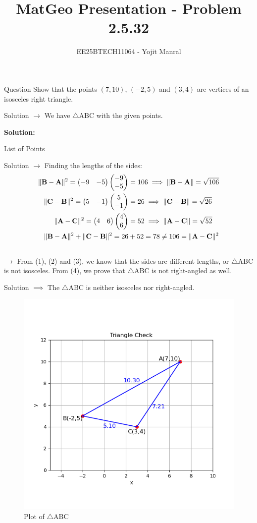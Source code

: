\documentclass{beamer}
\title{MatGeo Presentation - Problem 2.5.32}
\author{EE25BTECH11064 - Yojit Manral}
\date{}
\numberwithin{equation}{section}
\providecommand{\brak}[1]{\ensuremath{\left(#1\right)}}
\theoremstyle{remark}
\providecommand{\norm}[1]{\lVert#1\rVert}
\newcommand{\myvec}[1]{\ensuremath{\begin{pmatrix}#1\end{pmatrix}}}
\let\vec\mathbf
\begin{document}
\frame{\titlepage}
\begin{frame}{Question}
Show that the points $\brak{7,10}$, $\brak{-2,5}$ and $\brak{3,4}$ are vertices of an isosceles right triangle.
\end{frame}

\begin{frame}{Solution}
$\rightarrow$ We have $\triangle$ABC with the given points.

\textbf{Solution:}
\begin{table}[h!]    
  \centering
  
  \caption{List of Points}
  \label{Table_1}
\end{table}
\end{frame}

\begin{frame}{Solution}
$\rightarrow$ Finding the lengths of the sides:
\begin{align}
    \norm{\vec{B} - \vec{A}}^2 = \myvec{-9 & -5}\myvec{-9\\-5} &= 106 \implies \norm{\vec{B} - \vec{A}} = \sqrt{106}\\
    \norm{\vec{C} - \vec{B}}^2 = \myvec{5 & -1}\myvec{5\\-1} &= 26 \implies \norm{\vec{C} - \vec{B}} = \sqrt{26}\\
    \norm{\vec{A} - \vec{C}}^2 = \myvec{4 & 6}\myvec{4\\6} &= 52 \implies \norm{\vec{A} - \vec{C}} = \sqrt{52}\\
    \norm{\vec{B} - \vec{A}}^2 + \norm{\vec{C} - \vec{B}}^2 = 26 &+ 52 = 78 \neq 106 = \norm{\vec{A} - \vec{C}}^2\\
    \notag
\end{align}
$\rightarrow$ From (1), (2) and (3), we know that the sides are different lengths, or $\triangle$ABC is not isosceles. From (4), we prove that $\triangle$ABC is not right-angled as well.
\end{frame}

\begin{frame}{Solution}
$\implies$ The $\triangle$ABC is neither isosceles nor right-angled.
\begin{figure}[h!]
   \centering
   \includegraphics[width=0.6\linewidth]{figs/01.png}
   \caption{Plot of $\triangle$ABC}
   \label{Plot_1}
\end{figure}
\end{frame}
\end{document}
